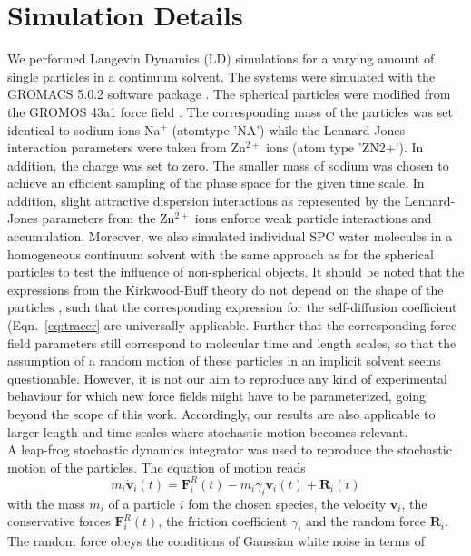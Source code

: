 \documentclass[aip,jcp,reprint]{revtex4-1}
\begin{document}
\section{Simulation Details}
We performed  Langevin Dynamics (LD) simulations for a varying amount of single particles in a continuum solvent. The systems were simulated with  the GROMACS 5.0.2 software package \cite{vanderspoel05a,gromacs08a,pronk13a}.
The spherical particles were modified from  the GROMOS 43a1 force field \cite{gunsteren96a}. The corresponding mass of the particles was set identical to sodium ions Na$^+$ (atomtype 'NA') while the Lennard-Jones interaction parameters were taken from Zn$^{2+}$ ions (atom type 'ZN2+'). In addition, the charge was set to zero. The smaller mass of sodium was chosen to achieve an efficient sampling of the phase space for the given time scale. In addition, slight attractive dispersion interactions as represented by the Lennard-Jones parameters from the Zn$^{2+}$ ions enforce weak particle interactions and accumulation. 
Moreover, we also simulated individual SPC water molecules \cite{berendsen81a} in a homogeneous continuum solvent with the same approach as for the spherical particles to test the influence of non-spherical objects. It should be noted that the expressions from the Kirkwood-Buff theory do not depend on the shape of the particles \cite{ben13a,smiatek17a,smith06,pierce08a}, such that the corresponding expression for the self-diffusion coefficient (Eqn.~\eqref{eq:tracer} are universally applicable.
Further that the corresponding force field parameters still correspond to molecular time and length scales, so that the assumption of a random motion of these particles in an implicit solvent seems questionable. However, it is not our aim to reproduce any kind of experimental behaviour for which new force fields might have to be parameterized, going beyond the scope of this work. Accordingly, our results are also applicable to larger length and time scales where stochastic motion becomes relevant.\\
A leap-frog stochastic dynamics integrator \cite{vangunsteren88a} was used to reproduce the stochastic motion of the particles. The equation of motion reads 
\begin{equation}
\label{eq:LD}
m_i\dot{\textbf{v}}_i(t) = {\textbf{F}}_i^R(t)-m_i\gamma_i{\textbf{v}}_i(t)+{\textbf{R}}_i(t)
\end{equation}
with the mass $m_i$ of a particle $i$ fom the chosen species, the velocity $\textbf{v}_i$, the conservative forces $ {\textbf{F}}_i^R(t)$, the friction coefficient $\gamma_i$ and the random force ${\textbf{R}}_i$. The random force obeys the conditions of Gaussian white noise in terms of 
\end{document}
